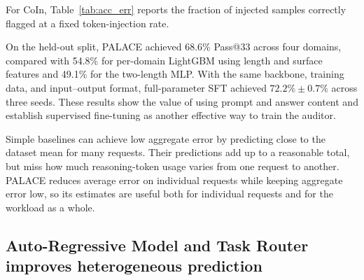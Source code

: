 \documentclass[pdflatex,sn-mathphys-num]{sn-jnl}%
\theoremstyle{thmstyleone}%
\theoremstyle{thmstyletwo}%
\theoremstyle{thmstylethree}%
\begin{document}
For CoIn, Table~\ref{tab:acc_err} reports the fraction of injected samples correctly flagged at a fixed token-injection rate.

On the held-out split, PALACE achieved 68.6\% Pass@33 across four domains, compared with 54.8\% for per-domain LightGBM using length and surface features and 49.1\% for the two-length MLP. With the same backbone, training data, and input--output format, full-parameter SFT achieved \(72.2\% \pm 0.7\%\) across three seeds. These results show the value of using prompt and answer content and establish supervised fine-tuning as another effective way to train the auditor.

Simple baselines can achieve low aggregate error by predicting close to the dataset mean for many requests. Their predictions add up to a reasonable total, but miss how much reasoning-token usage varies from one request to another. PALACE reduces average error on individual requests while keeping aggregate error low, so its estimates are useful both for individual requests and for the workload as a whole.

\subsection{Auto-Regressive Model and Task Router improves heterogeneous prediction}
\end{document}
